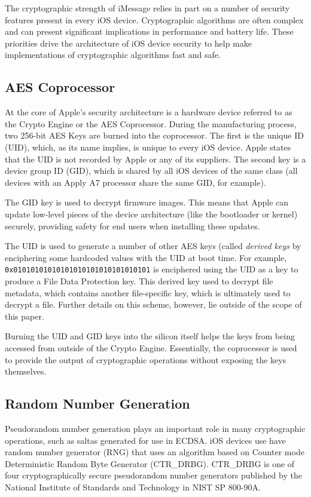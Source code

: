 The cryptographic strength of iMessage relies in part on a number of security
features present in every iOS device. Cryptographic algorithms are often
complex and can present significant implications in performance and battery
life.  These priorities drive the architecture of iOS device security to help
make implementations of cryptographic algorithms fast and safe.

\subsection{AES Coprocessor}
At the core of Apple's security architecture is a hardware device referred to
as the Crypto Engine or the AES Coprocessor. During the manufacturing process,
two 256-bit AES Keys are burned into the coprocessor. The first is the unique
ID (UID), which, as its name implies, is unique to every iOS device. Apple
states that the UID is not recorded by Apple or any of its
suppliers\cite{apple}. The second key is a device group ID (GID), which is
shared by all iOS devices of the same class (all devices with an Apply A7
processor share the same GID, for example).

The GID key is used to decrypt firmware images. This means that Apple can
update low-level pieces of the device architecture (like the bootloader or
kernel) securely, providing safety for end users when installing these updates.

The UID is used to generate a number of other AES keys (called \textit{derived
keys} by enciphering some hardcoded values with the UID at boot time. For
example, \texttt{0x01010101010101010101010101010101} is enciphered using the
UID as a key to produce a File Data Protection key. This derived key used to
decrypt file metadata, which contains another file-specific key, which is
ultimately used to decrypt a file. Further details on this scheme, however, lie
outside of the scope of this paper.

Burning the UID and GID keys into the silicon itself helps the keys from being
accessed from outside of the Crypto Engine. Essentially, the coprocessor is
used to provide the output of cryptographic operations without exposing the
keys themselves.

\subsection{Random Number Generation}
Pseudorandom number generation plays an important role in many cryptographic
operations, such as saltas generated for use in ECDSA. iOS devices use have
random number generator (RNG) that uses an algorithm based on Counter mode
Deterministic Random Byte Generator (CTR\_DRBG).  CTR\_DRBG is one of four
cryptographically secure pseudorandom number generators published by the
National Institute of Standards and Technology in NIST SP
800-90A\cite{nistsp80090a}.

